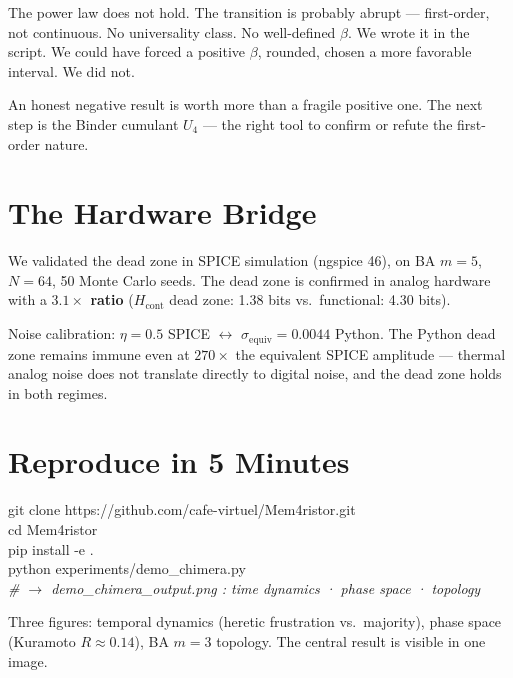 \documentclass[11pt, a4paper]{article}
\newcommand{\result}[1]{\textbf{\color{positive}#1}}
\begin{document}
The power law does not hold. The transition is probably abrupt --- first-order, not continuous. No
universality class. No well-defined $\beta$. We wrote it in the script. We could have forced a
positive $\beta$, rounded, chosen a more favorable interval. We did not.

An honest negative result is worth more than a fragile positive one. The next step is the Binder
cumulant $U_4$ --- the right tool to confirm or refute the first-order nature.

\section{The Hardware Bridge}

We validated the dead zone in SPICE simulation (ngspice 46), on BA $m=5$, $N=64$, 50 Monte Carlo
seeds. The dead zone is confirmed in analog hardware with a \result{$3.1\times$ ratio}
($H_{\mathrm{cont}}$ dead zone: 1.38 bits vs.\ functional: 4.30 bits).

Noise calibration: $\eta=0.5$ SPICE $\leftrightarrow$ $\sigma_{\mathrm{equiv}}=0.0044$ Python. The
Python dead zone remains immune even at $270\times$ the equivalent SPICE amplitude --- thermal
analog noise does not translate directly to digital noise, and the dead zone holds in both regimes.

\section{Reproduce in 5 Minutes}

\begin{codebox}
\ttfamily\small
git clone https://github.com/cafe-virtuel/Mem4ristor.git\\
cd Mem4ristor\\
pip install -e .\\
python experiments/demo\_chimera.py\\
\textit{\# $\to$ demo\_chimera\_output.png : time dynamics · phase space · topology}
\end{codebox}

Three figures: temporal dynamics (heretic frustration vs.\ majority), phase space
(Kuramoto $R\approx0.14$), BA $m=3$ topology. The central result is visible in one image.

\end{document}
